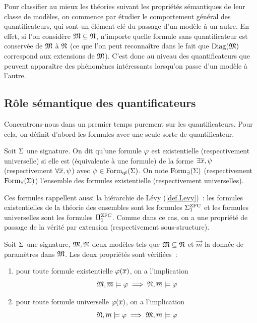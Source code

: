 Pour classifier au mieux les théories suivant les propriétés sémantiques de
leur classe de modèles, on commence par étudier le comportement général des
quantificateurs, qui sont un élément clé du passage d'un modèle à un autre. En
effet, si l'on considère $\mathfrak{M}\subseteq\mathfrak{N}$, n'importe quelle formule sans
quantificateur est conservée de $\mathfrak{M}$ à $\mathfrak{N}$ (ce que l'on peut
reconnaître dans le fait que $\operatorname{Diag}(\mathfrak{M})$ correspond aux extensions de
$\mathfrak{M}$). C'est donc au niveau des quantificateurs que peuvent apparaître des
phénomènes intéressants lorsqu'on passe d'un modèle à l'autre.

\subsection{Rôle sémantique des quantificateurs}

Concentrons-nous dans un premier temps purement sur les quantificateurs. Pour
cela, on définit d'abord les formules avec une seule sorte de quantificateur.

\begin{definition}
  Soit $\Sigma$ une signature. On dit qu'une formule $\varphi$ est existentielle
  (respectivement universelle) si elle est (équivalente à une formule) de la
  forme $\exists \overline{x}, \psi$ (respectivement $\forall \overline{x}, \psi$)
  avec $\psi\in\operatorname{Form}_{\mathrm{qf}}(\Sigma)$. On note $\operatorname{Form}_{\exists}(\Sigma)$
  (respectivement $\operatorname{Form}_{\forall}(\Sigma)$) l'ensemble des formules
  existentielle (respectivement universelles).
\end{definition}

Ces formules rappellent aussi la hiérarchie de Lévy (\cref{def.Levy})~: les
formules existentielles de la théorie des ensembles sont les formules
$\Sigma_{1}^{\operatorname{ZFC}}$ et les formules universelles sont les formules $\Pi_{1}^{\operatorname{ZFC}}$.
Comme dans ce cas, on a une propriété de passage de la vérité par extension
(respectivement sous-structure).

\begin{lemma}
  Soit $\Sigma$ une signature, $\mathfrak{M},\mathfrak{N}$ deux modèles tels que
  $\mathfrak{M}\subseteq\mathfrak{N}$ et $\vec m$ la donnée de paramètres dans $\mathfrak{M}$. Les
  deux propriétés sont vérifiées~:
  \begin{enumerate}[label=(\roman*)]
  \item pour toute formule existentielle $\varphi(\overline{x})$, on a l'implication
    \[\mathfrak{M},\overline{m}\models\varphi \implies \mathfrak{N},\overline{m}\models\varphi\]
  \item pour toute formule universelle $\varphi(\overline{x})$, on a l'implication
    \[\mathfrak{N},\overline{m}\models\varphi \implies \mathfrak{M},\overline{m}\models\varphi\]
  \end{enumerate}
\end{lemma}

